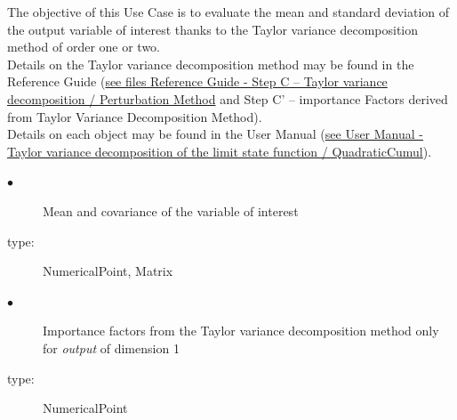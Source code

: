 \renewcommand{\filename}{docUC_CentralUncertainty_TaylorVarDecomposition.tex}
\renewcommand{\filetitle}{UC : Moments evaluation from the Taylor variance decomposition method and evaluation of the importance factors associated}

\HeaderIIILevel



The objective of this Use Case  is to evaluate the mean and standard deviation of the output variable of interest thanks to the Taylor variance decomposition method of order one or two.\\

Details on the  Taylor variance decomposition method may be found in the Reference Guide (\href{OpenTURNS_ReferenceGuide.pdf}{see files Reference Guide - Step C -- Taylor variance decomposition / Perturbation Method} and Step C' -- importance Factors derived from Taylor Variance Decomposition Method).\\

Details on each object may be found in the User Manual  (\href{OpenTURNS_UserManual_TUI.pdf}{see User Manual - Taylor variance decomposition of the limit state function / QuadraticCumul}).\\




{
  \begin{description}
  \item[$\bullet$] Mean and covariance of the variable of interest
  \item[type:] NumericalPoint, Matrix
  \item[$\bullet$] Importance factors from the Taylor variance decomposition method only for {\itshape output} of dimension 1
  \item[type:] NumericalPoint
  \end{description}
}

